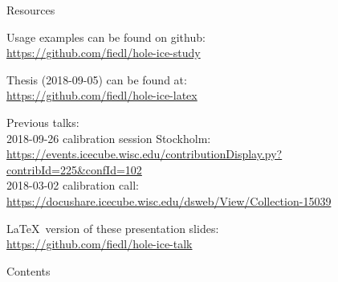 
\begin{frame}{Resources}
  \begin{center}
    Usage examples can be found on github: \\ \vspace{0.2cm}
    \url{https://github.com/fiedl/hole-ice-study}

    \vspace{1cm}

    Thesis (2018-09-05) can be found at: \\ \vspace{0.2cm}
    \url{https://github.com/fiedl/hole-ice-latex}

    \vspace{1cm}

    Previous talks: \\ \vspace{0.2cm}
    2018-09-26 calibration session Stockholm: \\
      \footnotesize\url{https://events.icecube.wisc.edu/contributionDisplay.py?contribId=225\&confId=102}\normalsize \\ \vspace{0.1cm}
    2018-03-02 calibration call: \\
      \footnotesize\url{https://docushare.icecube.wisc.edu/dsweb/View/Collection-15039}\normalsize

    \vspace{1cm}

    \LaTeX\ version of these presentation slides: \\ \vspace{0.2cm}
    \url{https://github.com/fiedl/hole-ice-talk}
  \end{center}
\end{frame}

\begin{frame}{Contents}

  \tableofcontents[subsectionstyle=show]


\end{frame}


